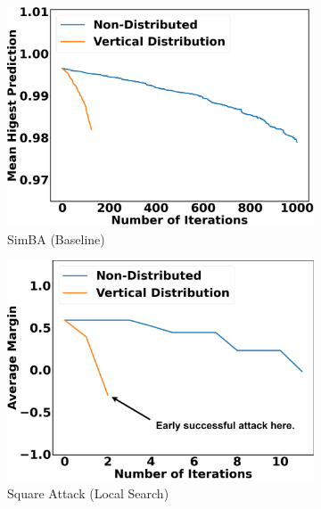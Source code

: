 \begin{figure}[tp]
\centering
\begin{subfigure}[b]{0.6\textwidth}
    \centering
    \includegraphics[width=\textwidth]{figures/chapter_classification/simba_attack_vertical_margin.png}
    \caption{SimBA (Baseline)}
    \label{fig:simba_plot}
\end{subfigure}
\hfill
\begin{subfigure}[b]{0.6\textwidth}
    \centering
    \includegraphics[width=\textwidth]{figures/chapter_classification/square_attack_vertical_margin.png}
    \caption{Square Attack (Local Search)}
    \label{fig:square_plot}
\end{subfigure}
\hfill
\begin{subfigure}[b]{0.6\textwidth}
    \centering

\end{subfigure}
\end{figure}
